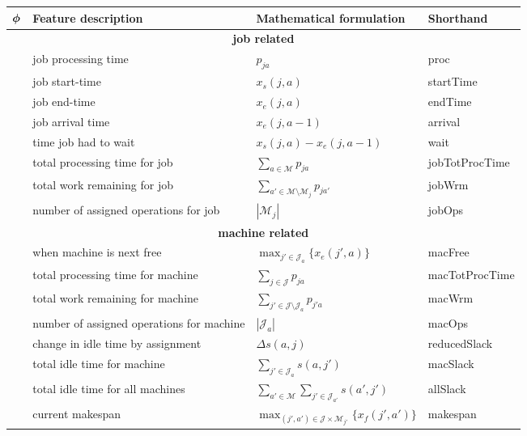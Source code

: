 \centering
\renewcommand{\arraystretch}{1.5}

\begin{tabular}{clll} %
	\toprule
	$\bm{\phi}$ & Feature description   & Mathematical formulation & Shorthand  \\ 
	\midrule
	\multicolumn{4}{c}{\textbf{job related}}\\
	\phiproc         & job processing time                       & $p_{ja}$   & 
	proc         \\
	\phistartTime    & job start-time                            & $x_s(j,a)$ & 
    startTime    \\
	\phiendTime      & job end-time                              & $x_e(j,a)$ &
    endTime      \\
	\phiarrivalTime  & job arrival time                          & $x_e(j,a-1)$&
    arrival      \\ 
	\phiwait         & time job had to wait                      & 
	$x_s(j,a)-x_e(j,a-1)$ & 
    wait         \\   
	\phijobTotProcTime    & total processing time for job             & 
    $\sum_{a\in \mathcal{M}}p_{ja}$ & 
    jobTotProcTime \\
	\phijobWrm       & total work remaining for job              & 
	$\sum_{a'\in\mathcal{M}\setminus \mathcal{M}_{j}}p_{ja'}$ & 
    jobWrm       \\
	\phijobOps       & number of assigned operations for job     & 
	$|\mathcal{M}_j|$ & 
    jobOps       \\ 
	\midrule
	\multicolumn{4}{c}{\textbf{machine related}}\\
	\phimacFree      & when machine is next free                 & 
    $\max_{j'\in \mathcal{J}_a} \{x_e(j',a)\}$ &
	macFree      \\
	\phimacTotProcTime    & total processing time for machine    & 
    $\sum_{j\in \mathcal{J}}p_{ja}$ & 
    macTotProcTime \\
	\phimacWrm       & total work remaining for machine          & 
	$\sum_{j'\in\mathcal{J}\setminus \mathcal{J}_{a}}p_{j'a}$ &  
    macWrm       \\
	\phimacOps       & number of assigned operations for machine & 
	$|\mathcal{J}_a|$ & 
    macOps       \\
	\phireducedSlack & change in idle time by assignment         & 
    $\Delta s(a,j)$ &
	reducedSlack \\
	\phimacSlack        & total idle time for machine               & 
    $\sum_{j'\in \mathcal{J}_a}s(a,j')$ &
    macSlack        \\
	\phiallSlack   & total idle time for all machines          & $\sum_{a'\in 
	\mathcal{M}}\sum_{j'\in \mathcal{J}_{a'}}s(a',j')$                    & 
	allSlack   \\
	\phimakespan     & current makespan                          &
    $\max_{(j',a')\in \mathcal{J} \times \mathcal{M}_{j'}}\{x_f(j',a')\}$ & 
    makespan     \\
	\bottomrule
\end{tabular}
